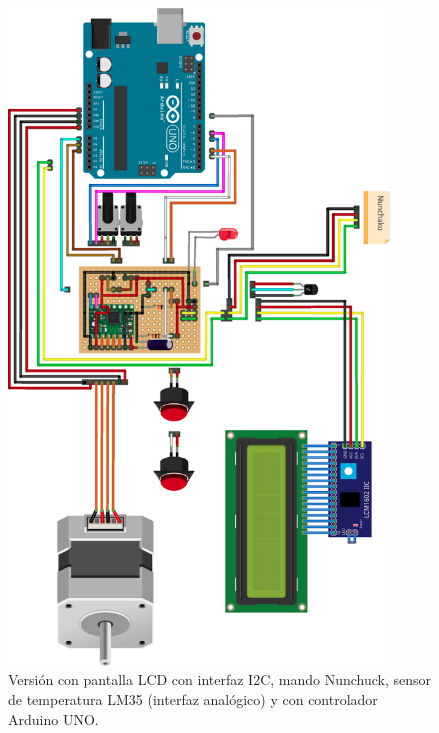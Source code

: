 \begin{figure}[h]
	\centering
	\includegraphics[width=0.9\textwidth]{../images/circuito3}
	\caption[Versión 2 del dispositivo]{Versión con pantalla LCD con interfaz I2C, mando Nunchuck, sensor de temperatura LM35 (interfaz analógico) y con controlador Arduino UNO.}
	\label{circuito3}
\end{figure}


